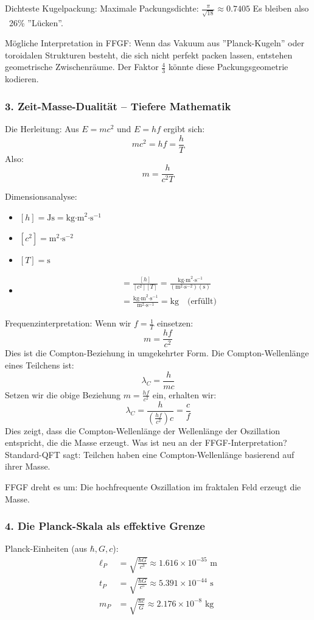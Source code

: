 	Dichteste Kugelpackung:
	Maximale Packungsdichte: \( \frac{\pi}{\sqrt{18}} \approx 0.7405 \)
	Es bleiben also ~26\% ''Lücken''.
	
	Mögliche Interpretation in FFGF:
	Wenn das Vakuum aus ''Planck-Kugeln'' oder toroidalen Strukturen besteht, die sich nicht perfekt packen lassen, entstehen geometrische Zwischenräume. Der Faktor \( \frac{4}{3} \) könnte diese Packungsgeometrie kodieren.
	
	\subsubsection{3. Zeit-Masse-Dualität – Tiefere Mathematik}
	Die Herleitung:
	Aus \( E = mc^2 \) und \( E = hf \) ergibt sich:
	\[
	mc^2 = hf = \frac{h}{T}
	\]
	Also:
	\[
	m = \frac{h}{c^2 T}
	\]
	
	Dimensionsanalyse:
	\begin{itemize}
		\item \( [h] = \text{Js} = \text{kg·m}^2\text{·s}^{-1} \)
		\item \( [c^2] = \text{m}^2\text{·s}^{-2} \)
		\item \( [T] = \text{s} \)
		\item \begin{align}
			[m] &= \frac{[h]}{[c^2][T]} = \frac{\text{kg·m}^2\text{·s}^{-1}}{(\text{m}^2\text{·s}^{-2})(\text{s})} \\
			&= \frac{\text{kg·m}^2\text{·s}^{-1}}{\text{m}^2\text{·s}^{-1}} = \text{kg} \quad \text{(erfüllt)}
		\end{align}
	\end{itemize}
	
	Frequenzinterpretation:
	Wenn wir \( f = \frac{1}{T} \) einsetzen:
	\[
	m = \frac{hf}{c^2}
	\]
	Dies ist die Compton-Beziehung in umgekehrter Form. Die Compton-Wellenlänge eines Teilchens ist:
	\[
	\lambda_C = \frac{h}{mc}
	\]
	Setzen wir die obige Beziehung \( m = \frac{hf}{c^2} \) ein, erhalten wir:
	\[
	\lambda_C = \frac{h}{\left(\frac{hf}{c^2}\right)c} = \frac{c}{f}
	\]
	Dies zeigt, dass die Compton-Wellenlänge der Wellenlänge der Oszillation entspricht, die die Masse erzeugt.
	Was ist neu an der FFGF-Interpretation?
	Standard-QFT sagt: Teilchen haben eine Compton-Wellenlänge basierend auf ihrer Masse.
	
	FFGF dreht es um: Die hochfrequente Oszillation im fraktalen Feld erzeugt die Masse.
	
	\subsubsection{4. Die Planck-Skala als effektive Grenze}
	Planck-Einheiten (aus \( \hbar, G, c \)):
	\begin{align}
		\ell_P &= \sqrt{\frac{\hbar G}{c^3}} \approx 1.616 \times 10^{-35} \text{ m} \\
		t_P &= \sqrt{\frac{\hbar G}{c^5}} \approx 5.391 \times 10^{-44} \text{ s} \\
		m_P &= \sqrt{\frac{\hbar c}{G}} \approx 2.176 \times 10^{-8} \text{ kg}
	\end{align}
	

